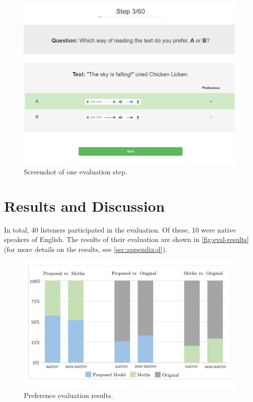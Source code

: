 \begin{figure}[H]
\centering
\includegraphics[scale=.4]{figures/evaluation-environment.png}
\caption[Evaluation step]{Screenshot of one evaluation step.}
\label{fig:eval-step}
\end{figure}

\clearpage

\section{Results and Discussion}


In total, 40 listeners participated in the evaluation. 
Of these, 10 were native speakers of English.
The results of their evaluation are  shown in \autoref{fig:eval-results} (for more details on the results, see \autoref{sec:appendix-d}).

\begin{figure}[H]
\centering
\includegraphics[scale=.5]{figures/eval-chart.pdf}
\caption[Evaluation results]{Preference evaluation results.}
\label{fig:eval-results}
\end{figure}

